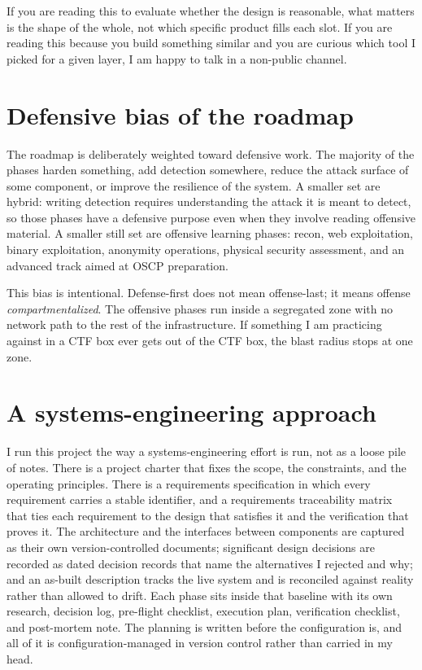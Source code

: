\documentclass[12pt]{article}
\begin{document}
If you are reading this to evaluate whether the design is reasonable, what matters is the shape of the whole, not which specific product fills each slot. If you are reading this because you build something similar and you are curious which tool I picked for a given layer, I am happy to talk in a non-public channel.

\section{Defensive bias of the roadmap}

The roadmap is deliberately weighted toward defensive work. The majority of the phases harden something, add detection somewhere, reduce the attack surface of some component, or improve the resilience of the system. A smaller set are hybrid: writing detection requires understanding the attack it is meant to detect, so those phases have a defensive purpose even when they involve reading offensive material. A smaller still set are offensive learning phases: recon, web exploitation, binary exploitation, anonymity operations, physical security assessment, and an advanced track aimed at OSCP preparation.

This bias is intentional. Defense-first does not mean offense-last; it means offense \emph{compartmentalized}. The offensive phases run inside a segregated zone with no network path to the rest of the infrastructure. If something I am practicing against in a CTF box ever gets out of the CTF box, the blast radius stops at one zone.

\section{A systems-engineering approach}

I run this project the way a systems-engineering effort is run, not as a loose pile of notes. There is a project charter that fixes the scope, the constraints, and the operating principles. There is a requirements specification in which every requirement carries a stable identifier, and a requirements traceability matrix that ties each requirement to the design that satisfies it and the verification that proves it. The architecture and the interfaces between components are captured as their own version-controlled documents; significant design decisions are recorded as dated decision records that name the alternatives I rejected and why; and an as-built description tracks the live system and is reconciled against reality rather than allowed to drift. Each phase sits inside that baseline with its own research, decision log, pre-flight checklist, execution plan, verification checklist, and post-mortem note. The planning is written before the configuration is, and all of it is configuration-managed in version control rather than carried in my head.
\end{document}
